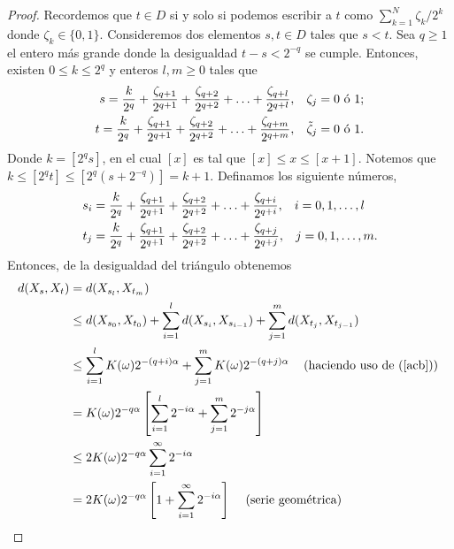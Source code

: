 \begin{proof}
Recordemos que $t \in D$ si y solo si podemos escribir a $t$ como $\sum_{k=1}^N \zeta_k / 2^k$ donde $\zeta_k \in \{0, 1\}$. Consideremos dos elementos $s, t \in D$ tales que $s < t$. Sea $q \geq 1$ el entero más grande donde la desigualdad $t - s < 2^{-q}$ se cumple. Entonces, existen $0 \leq k \leq 2^{q}$ y enteros $l, m \geq 0$ tales que
	\begin{align*}
	s = \frac{k}{2^q} + \frac{\zeta_{q+1}}{2^{q+1}} + \frac{\zeta_{q+2}}{2^{q+2}} + \ldots + \frac{\zeta_{q+l}}{2^{q+l}}, \hspace{0.3cm} \zeta_j = 0 \text{ ó } 1; \\
	t = \frac{k}{2^q} + \frac{\zeta_{q+1}}{2^{q+1}} + \frac{\zeta_{q+2}}{2^{q+2}} + \ldots + \frac{\zeta_{q+m}}{2^{q+m}}, \hspace{0.3cm} \tilde{\zeta}_j = 0 \text{ ó } 1.
	\end{align*}
Donde $k = [2^q s]$, en el cual $[x]$ es tal que $[x] \leq x \leq [x+1]$. Notemos que $k \leq [2^q t] \leq [2^q (s + 2^{-q})] = k+1$. Definamos los siguiente números, 
	\begin{align*}
	s_i & = \frac{k}{2^q} + \frac{\zeta_{q+1}}{2^{q+1}} + \frac{\zeta_{q+2}}{2^{q+2}} + \ldots + \frac{\zeta_{q+i}}{2^{q+i}}, \hspace{0.3cm} i = 0, 1, \ldots, l \\
	t_j & = \frac{k}{2^q} + \frac{\zeta_{q+1}}{2^{q+1}} + \frac{\zeta_{q+2}}{2^{q+2}} + \ldots + \frac{\zeta_{q+j}}{2^{q+j}}, \hspace{0.3cm} j = 0, 1, \ldots, m.
	\end{align*}
Entonces, de la desigualdad del triángulo obtenemos
	\begin{align*}
	d(X_s, X_t) & = d(X_{s_l}, X_{t_m}) \\
	& \leq d(X_{s_0}, X_{t_0}) + \sum_{i=1}^l d(X_{s_i}, X_{s_{i-1}}) + \sum_{j=1}^m d(X_{t_j}, X_{t_{j-1}}) \\
	& \leq \sum_{i=1}^l K(\omega) 2^{-(q+i) \alpha} + \sum_{j=1}^m K(\omega) 2^{-(q+j) \alpha} \hspace{0.3cm} \text{ (haciendo uso de (\ref{acb})) } \\
	& = K(\omega) 2^{-q \alpha} \left[ \sum_{i=1}^l 2^{-i \alpha} + \sum_{j=1}^m 2^{-j \alpha} \right] \\
	& \leq 2K(\omega) 2^{-q \alpha} \sum_{i=1}^{\infty} 2^{-i \alpha} \\
	& = 2K(\omega) 2^{-q \alpha} \left[1 + \sum_{i=1}^{\infty} 2^{-i \alpha} \right]  \hspace{0.3cm} \text{ (serie geométrica) } \\

\end{align*}
\end{proof}
